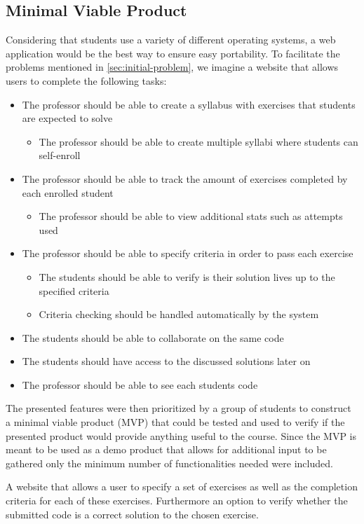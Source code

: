 \subsection{Minimal Viable Product}
Considering that students use a variety of different operating systems, a web application would be the best way to ensure easy portability.
To facilitate the problems mentioned in \ref{sec:initial-problem}, we imagine a website that allows users to complete the following tasks:
\begin{itemize}
	\item The professor should be able to create a syllabus with exercises that students are expected to solve
	\begin{itemize}
		\item The professor should be able to create multiple syllabi where students can self-enroll
	\end{itemize}
	\item The professor should be able to track the amount of exercises completed by each enrolled student
	\begin{itemize}
		\item The professor should be able to view additional stats such as attempts used 
	\end{itemize}
	\item The professor should be able to specify criteria in order to pass each exercise 
	\begin{itemize}
		\item The students should be able to verify is their solution lives up to the specified criteria
		\item Criteria checking should be handled automatically by the system
	\end{itemize}
	\item The students should be able to collaborate on the same code
	\item The students should have access to the discussed solutions later on
	\item The professor should be able to see each students code
\end{itemize}

The presented features were then prioritized by a group of students to construct a minimal viable product (MVP) that could be tested and used to verify if the presented product would provide anything useful to the course. Since the MVP is meant to be used as a demo product that allows for additional input to be gathered only the minimum number of functionalities needed were included.

\begin{displayquote}
A website that allows a user to specify a set of exercises as well as the completion criteria for each of these exercises. Furthermore an option to verify whether the submitted code is a correct solution to the chosen exercise.
\end{displayquote}





